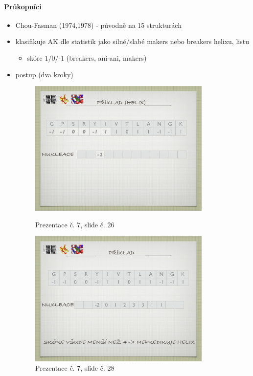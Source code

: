 \documentclass[DIV=8]{scrreprt}
\begin{document}
\paragraph{Průkopníci}
\begin{itemize}[nosep]
    \item Chou-Fasman (1974,1978) - původně na 15 strukturách
    \item klasifikuje AK dle statistik jako silné/slabé makers nebo breakers helixu, listu
\begin{itemize}[nosep]
    \item skóre 1/0/-1 (breakers, ani-ani, makers)
\end{itemize}

    \item postup (dva kroky) \begin{figure}
    \caption{Prezentace č. 7, slide č. 26}
    \includegraphics[width=0.85\textwidth]{slides-7/slide-26.jpg}
    \centering
    \label{slides-7-slide-26}
\end{figure}
\begin{figure}
    \caption{Prezentace č. 7, slide č. 28}
    \includegraphics[width=0.85\textwidth]{slides-7/slide-28.jpg}

\end{figure}
\end{itemize}
\end{document}
